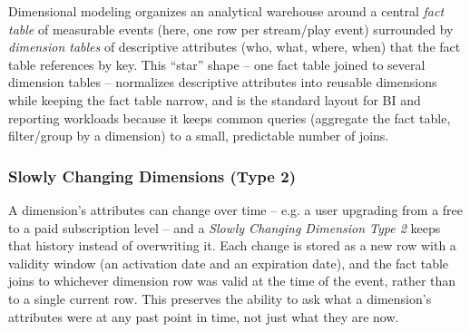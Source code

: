 Dimensional modeling organizes an analytical warehouse around a central \emph{fact table} of measurable events (here, one row per stream/play event) surrounded by \emph{dimension tables} of descriptive attributes (who, what, where, when) that the fact table references by key. This ``star'' shape -- one fact table joined to several dimension tables -- normalizes descriptive attributes into reusable dimensions while keeping the fact table narrow, and is the standard layout for BI and reporting workloads because it keeps common queries (aggregate the fact table, filter/group by a dimension) to a small, predictable number of joins.

\subsubsection{Slowly Changing Dimensions (Type 2)}

A dimension's attributes can change over time -- e.g. a user upgrading from a free to a paid subscription level -- and a \emph{Slowly Changing Dimension Type 2} keeps that history instead of overwriting it. Each change is stored as a new row with a validity window (an activation date and an expiration date), and the fact table joins to whichever dimension row was valid at the time of the event, rather than to a single current row. This preserves the ability to ask what a dimension's attributes were at any past point in time, not just what they are now.
